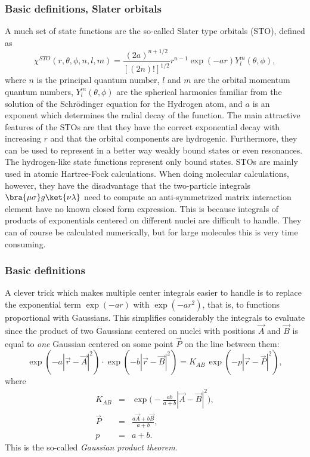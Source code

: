 \frame
{
  \frametitle{Basic definitions, Slater orbitals}
\begin{small}
{\scriptsize
A much set of state functions are the so-called 
Slater type orbitals (STO), defined as
\begin{equation}
 \chi^{STO}(r,\theta,\phi,n,l,m) = \frac{(2a)^{n+1/2}}{[(2n)!]^{1/2}}r^{n-1}\exp(-a r) Y^m_l(\theta,\phi),
\end{equation}
where $n$ is the principal quantum number, $l$ and $m$ are the orbital momentum quantum numbers,
$Y^m_l(\theta,\phi)$ are the spherical harmonics familiar from the solution of the Schr\"odinger
equation for the Hydrogen atom, and $a$ is an exponent which determines the radial decay of the
function. The main attractive features of the STOs are that they have the correct exponential decay with
increasing $r$ and that the orbital components are hydrogenic. 
Furthermore, they can be used to represent in a better way weakly bound states or even resonances. The hydrogen-like state functions 
represent only bound states.
STOs are mainly 
used in atomic Hartree-Fock calculations. When doing molecular calculations, however, they have the
disadvantage that the two-particle integrals $\bra{\mu\sigma}g\ket{\nu\lambda}$ need to compute 
an anti-symmetrized matrix interaction element have no known closed form expression. This is because integrals of products
of exponentials centered on different nuclei are difficult to handle. They can of course be calculated
numerically, but for large molecules this is very time consuming.

}
\end{small}
}
\frame
{
  \frametitle{Basic definitions}
\begin{small}
{\scriptsize
A clever trick which makes multiple center integrals easier to handle is to replace the exponential
term $\exp(-a r)$ with $\exp(-a r^2)$, that is, to functions proportional with Gaussians. This simplifies 
considerably the integrals to evaluate since the product of two Gaussians centered on nuclei with positions
$\vec A$ and $\vec B$ is equal to \emph{one} Gaussian centered on some point $\vec P$ on
the line between them:
\begin{equation}
\label{eq:gaussian_product}
 \exp(-a|\vec r - \vec A|^2)\cdot \exp(-b|\vec r - \vec B|^2) = K_{AB}\,\exp(-p|\vec r - \vec P|^2),
\end{equation}
where
\begin{eqnarray}
 K_{AB} & = & \exp\Big(-\frac{ab}{a + b}|\vec A - \vec B|^2\Big), \\
 \vec P & = & \frac{a \vec A + b \vec B}{a + b}, \\
 p & = & a + b.
\end{eqnarray}
This is the so-called \emph{Gaussian product theorem}.
}
\end{small}
}
